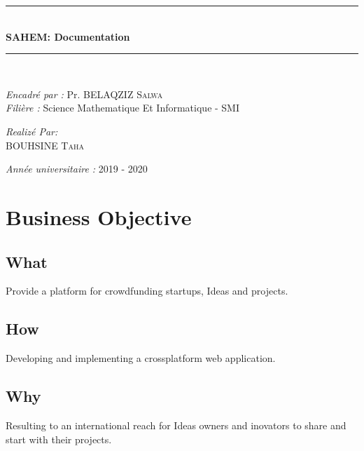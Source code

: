 \documentclass[11pt, openany]{report}
\newcommand{\HRule}{\rule{\linewidth}{0.5mm}}
\begin{document}
\begin{titlepage}
\begin{sffamily}
\begin{center}
    \HRule \\[0.4cm]
    { \huge \bfseries  SAHEM: Documentation \\[0.4cm] }

    \HRule \\[2cm]
    \begin{minipage}{0.6\textwidth}
      \begin{flushleft} \large
        \emph{Encadré par : } Pr. \textsc{BELAQZIZ Salwa}\\
        \emph{Filière : } Science Mathematique Et Informatique - SMI \\
        
      \end{flushleft}
    \end{minipage}
    \newline \vskip1.5cm
    \begin{minipage}{0.5\textwidth}
      \begin{center} \large
        \emph{Realizé Par:} \\
                            \textsc{BOUHSINE Taha}\\
                         
      \end{center}
    \end{minipage}
    \vskip1.5cm
    \vfill

    {\large \emph{Année universitaire : } 2019 - 2020}

  \end{center}
  \end{sffamily}
  \thispagestyle{empty}
\end{titlepage}


\clearpage





\renewcommand{\baselinestretch}{1.30}\small \normalsize

\tableofcontents
\listoffigures
\listoftables
\renewcommand{\baselinestretch}{1.18}\small \normalsize
\newpage
{}

\chapter{ Business Objective }
\section*{What}
Provide a platform for crowdfunding startups, Ideas and projects.
\section*{How}
Developing and implementing a crossplatform web application.
\section*{Why} 
Resulting to an international reach for Ideas owners and inovators to share and start with their projects.
\end{document}
